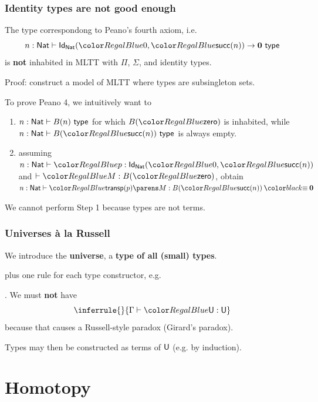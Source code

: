 \documentclass[handout]{beamer} %
\begin{document}
\begin{frame}
  \frametitle{Identity types are not good enough}
  
  \begin{theorem}
    The type correspondong to Peano's fourth axiom, i.e.
    \[
      \IsTy[n : \Nat]{\Id{\Nat}{0}{\Succ{n}} \to \mathbf{0}}[]
    \]
    is \textbf{not} inhabited in MLTT with $\Pi$, $\Sigma$, and identity types.
  \end{theorem}
  Proof: construct a model of MLTT where types are subsingleton sets.

  \medskip

  To prove Peano 4, we intuitively want to
  \begin{enumerate}
    \item {} $\IsTy[n : \Nat]{B(n)}[]$ for which
      $B(\Tm{\Zero})$ is inhabited, while $\IsTy[n : \Nat]{B(\Tm{\Succ{n}})}[]$
      is always empty.
    \item assuming $\IsTm[n : \Nat]{p}{\Id{\Nat}{0}{\Succ{n}}}$ and
      $\IsTm[]{M}{B(\Tm{\Zero})}$, obtain $\IsTm[n :
      \Nat]{\App{\Transport{p}}{M}}{B(\Tm{\Succ{n}})} \deq \textbf{0}$
  \end{enumerate}
  We cannot perform Step 1 because types are not terms.
\end{frame}

\begin{frame}
  \frametitle{Universes \`{a} la Russell}
  We introduce the \textbf{universe}, a \textbf{type of all (small) types}.
  plus one rule for each type constructor, e.g.
  \begin{mathpar}
  \end{mathpar}
  . We must \textbf{not} have
  \[
    \inferrule{ }{\IsTm{\Uni}{\Uni}}
  \]
  because that causes a Russell-style paradox (Girard's paradox).
  
  \medskip
  
  Types may then be constructed as terms of $\Uni$ (e.g. by induction).
\end{frame}


\section{Homotopy}
\end{document}
